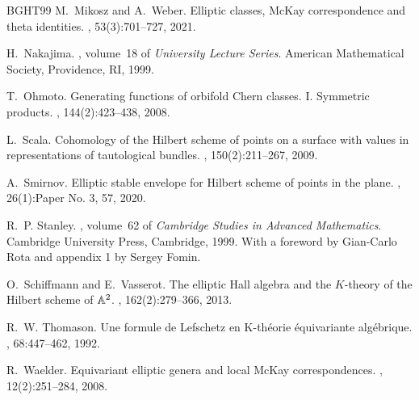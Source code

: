 \documentclass[12pt,a4paper]{amsart}
\theoremstyle{plain}
\theoremstyle{definition}
\theoremstyle{remark}
\begin{document}
\begin{thebibliography}{BGHT99}
	M.~Mikosz and A.~Weber.
	\newblock Elliptic classes, {M}c{K}ay correspondence and theta identities.
	, 53(3):701--727, 2021.
	
	H.~Nakajima.
	, volume~18
	of {\em University Lecture Series}.
	\newblock American Mathematical Society, Providence, RI, 1999.
	
	T.~Ohmoto.
	\newblock Generating functions of orbifold {C}hern classes. {I}. {S}ymmetric
	products.
	, 144(2):423--438, 2008.
	
	L.~Scala.
	\newblock Cohomology of the {H}ilbert scheme of points on a surface with values
	in representations of tautological bundles.
	, 150(2):211--267, 2009.
	
	A.~Smirnov.
	\newblock Elliptic stable envelope for {H}ilbert scheme of points in the plane.
	, 26(1):Paper No. 3, 57, 2020.
	
	R.~P. Stanley.
	, volume~62 of {\em
		Cambridge Studies in Advanced Mathematics}.
	\newblock Cambridge University Press, Cambridge, 1999.
	\newblock With a foreword by Gian-Carlo Rota and appendix 1 by Sergey Fomin.
	
	O.~Schiffmann and E.~Vasserot.
	\newblock The elliptic {H}all algebra and the {$K$}-theory of the {H}ilbert
	scheme of {$\Bbb A^2$}.
	, 162(2):279--366, 2013.
	
	R.~W. Thomason.
	\newblock Une formule de {L}efschetz en {K}-th{\'e}orie {\'e}quivariante
	alg{\'e}brique.
	, 68:447--462, 1992.
	
	R.~Waelder.
	\newblock Equivariant elliptic genera and local {M}c{K}ay correspondences.
	, 12(2):251--284, 2008.
	
\end{thebibliography}
\end{document}
